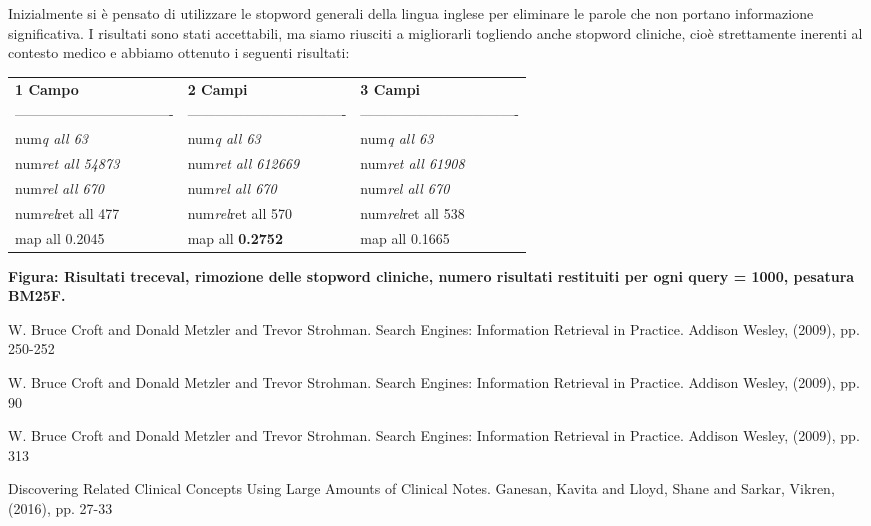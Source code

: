 \documentclass[runningheads]{llncs}
\begin{document}
Inizialmente si \`e pensato di utilizzare le stopword generali della lingua inglese per eliminare le
parole che non portano informazione significativa. I risultati sono stati accettabili, ma siamo riusciti a migliorarli togliendo anche stopword cliniche, cio\`e  strettamente inerenti al contesto medico e abbiamo ottenuto i seguenti risultati:
\begin{table}
\centering
\begin{tabular}{lll}
\textbf{ 1 Campo }           & \textbf{ 2 Campi }           & \textbf{ 3 Campi }            \\
---------------------------------- & ---------------------------------- & ----------------------------------  \\
 num\textit{q all 63 }       &  num\textit{q all 63 }       &  num\textit{q all 63 }        \\
 num\textit{ret all 54873 }  &  num\textit{ret all 612669 }  &  num\textit{ret all 61908 }   \\
 num\textit{rel all 670 }    &  num\textit{rel all 670 }    &  num\textit{rel all 670 }     \\
 num\textit{rel}ret all 477  &  num\textit{rel}ret all 570  &  num\textit{rel}ret all 538   \\
map all 0.2045               & map all \bf 0.2752               & map all 0.1665               
\end{tabular} 
\begin{tablenotes}
      \small
      \item \bf Figura: Risultati treceval, rimozione delle stopword cliniche, numero risultati restituiti per 
ogni query = 1000, pesatura BM25F.
    \end{tablenotes}
\end{table}



%

\begin{thebibliography}{8}

W. Bruce Croft and Donald Metzler and Trevor Strohman. Search Engines: Information Retrieval in Practice. Addison Wesley, (2009), pp. 250-252

W. Bruce Croft and Donald Metzler and Trevor Strohman. Search Engines: Information Retrieval in Practice. Addison Wesley, (2009), pp. 90

W. Bruce Croft and Donald Metzler and Trevor Strohman. Search Engines: Information Retrieval in Practice. Addison Wesley, (2009), pp. 313

Discovering Related Clinical Concepts Using Large Amounts of Clinical Notes. Ganesan, Kavita and Lloyd, Shane and Sarkar,
 Vikren, (2016), pp. 27-33

\end{thebibliography}
\end{document}
